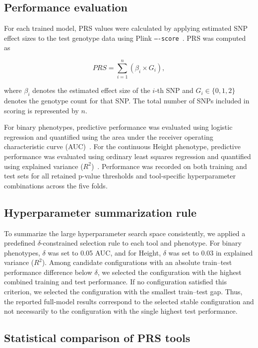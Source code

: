 \documentclass[pdflatex,sn-basic]{sn-jnl}
\begin{document}
\subsection*{Performance evaluation}

For each trained model, PRS values were calculated by applying estimated SNP effect sizes to the test genotype data using Plink \texttt{----score}~\cite{Choi2020}. PRS was computed as

\begin{equation}
PRS = \sum_{i=1}^{n} \left( \beta_i \times G_i \right),
\label{Plinkequation}
\end{equation}

where $\beta_i$ denotes the estimated effect size of the $i$-th SNP and $G_i \in \{0,1,2\}$ denotes the genotype count for that SNP. The total number of SNPs included in scoring is represented by $n$.

For binary phenotypes, predictive performance was evaluated using logistic regression and quantified using the area under the receiver operating characteristic curve (AUC)~\cite{Sperandei2014}. For the continuous Height phenotype, predictive performance was evaluated using ordinary least squares regression and quantified using explained variance ($R^2$)~\cite{Zdaniuk2014}. Performance was recorded on both training and test sets for all retained p-value thresholds and tool-specific hyperparameter combinations across the five folds.

\subsection*{Hyperparameter summarization rule}

To summarize the large hyperparameter search space consistently, we applied a predefined $\delta$-constrained selection rule to each tool and phenotype. For binary phenotypes, $\delta$ was set to 0.05 AUC, and for Height, $\delta$ was set to 0.03 in explained variance ($R^2$). Among candidate configurations with an absolute train--test performance difference below $\delta$, we selected the configuration with the highest combined training and test performance. If no configuration satisfied this criterion, we selected the configuration with the smallest train--test gap. Thus, the reported full-model results correspond to the selected stable configuration and not necessarily to the configuration with the single highest test performance. 

\subsection*{Statistical comparison of PRS tools}
\end{document}
